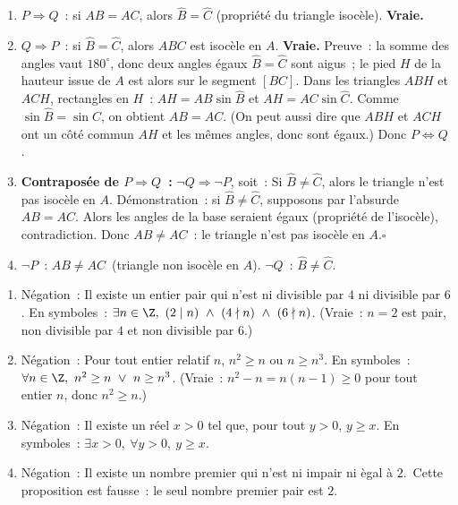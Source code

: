 \begin{enumerate}
  \item $P\Rightarrow Q$~: si $AB=AC$, alors $\hat B=\hat C$ (propri\'et\'e du triangle isoc\`ele).
        \textbf{Vraie.}
  \item $Q\Rightarrow P$~: \og si $\hat B=\hat C$, alors $ABC$ est isoc\`ele en $A$\fg.
        \textbf{Vraie.} Preuve~: la somme des angles vaut $180^\circ$, donc deux angles
        \'egaux $\hat B=\hat C$ sont aigus~; le pied $H$ de la hauteur issue de $A$
        est alors sur le segment $[BC]$. Dans les triangles $ABH$ et $ACH$, rectangles en $H$~:
        $AH=AB\sin\hat B$ et $AH=AC\sin\hat C$. Comme $\sin\hat B=\sin\hat C$, on obtient
        $AB=AC$. (On peut aussi dire que $ABH$ et $ACH$ ont un c\^ot\'e commun $AH$ et les
        m\^emes angles, donc sont \'egaux.)
        Donc $P\Leftrightarrow Q$.
  \item \textbf{Contrapos\'ee de $P\Rightarrow Q$~:}
        $\lnot Q\Rightarrow\lnot P$, soit~:
        \og Si $\hat B\ne\hat C$, alors le triangle n'est pas isoc\`ele en $A$\fg.
        D\'emonstration~: si $\hat B\ne\hat C$, supposons par l'absurde $AB=AC$.
        Alors les angles de la base seraient \'egaux (propri\'et\'e de l'isoc\`ele),
        contradiction. Donc $AB\ne AC$~: le triangle n'est pas isoc\`ele en $A$.\hfill$\square$
  \item $\lnot P$~: \og $AB\ne AC$\fg\ (triangle non isoc\`ele en $A$).
        $\lnot Q$~: \og $\hat B\ne\hat C$\fg.
\end{enumerate}


\begin{enumerate}
  \item N\'egation~: \og Il existe un entier pair qui n'est ni divisible par $4$
        ni divisible par $6$.\fg
        En symboles~: $\exists n\in\Z,\ (2\mid n)\ \land\ (4\nmid n)\ \land\ (6\nmid n)$.
        (Vraie~: $n=2$ est pair, non divisible par $4$ et non divisible par $6$.)
  \item N\'egation~: \og Pour tout entier relatif $n$, $n^2\geq n$ ou $n\geq n^3$.\fg
        En symboles~: $\forall n\in\Z,\ n^2\geq n\ \lor\ n\geq n^3$.
        (Vraie~: $n^2-n=n(n-1)\geq0$ pour tout entier $n$, donc $n^2\geq n$.)
  \item N\'egation~: \og Il existe un r\'eel $x>0$ tel que, pour tout $y>0$, $y\geq x$.\fg
        En symboles~: $\exists x>0,\ \forall y>0,\ y\geq x$.
  \item N\'egation~: \og Il existe un nombre premier qui n'est ni impair ni
        \`egal \`a $2$.\fg\ Cette proposition est fausse~: le seul nombre premier
        pair est $2$.
\end{enumerate}

